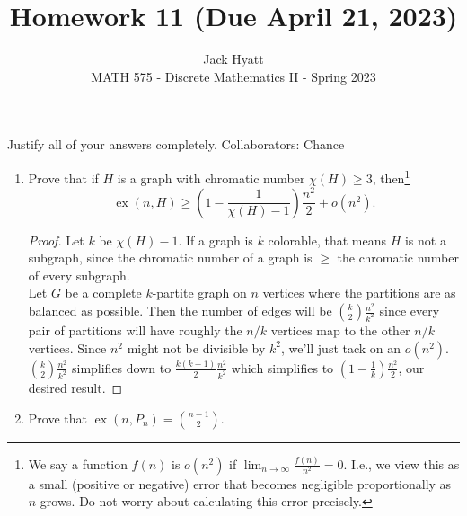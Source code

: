 \documentclass[12pt]{article}
\begin{document}
	
	
	
	\title{Homework 11 (Due April 21, 2023)}
	\author{Jack Hyatt\\ %
		MATH 575 - Discrete Mathematics II - Spring 2023} 
	
	\maketitle
	
	Justify all of your answers completely.\m
	\text{ }\text{ }\text{ }\text{ }\text{ } Collaborators: Chance
	
	
	\medskip 
	
	\begin{enumerate}


\item Prove that if $H$ is a graph with chromatic number $\chi(H) \geq 3$, then\footnote{We say a function $f(n)$ is $o(n^2)$ if $\lim_{n \to \infty} \frac{f(n)}{n^2} =0$. I.e., we view this as a small (positive or negative) error that becomes negligible proportionally as $n$ grows. Do not worry about calculating this error precisely.}
 \[\operatorname{ex}(n, H)\geq \left(1-\frac{1}{\chi(H)-1}\right) \frac{n^2}{2} + o(n^2).\]

\begin{proof}
	Let $k$ be $\chi(H)-1$. If a graph is $k$ colorable, that means $H$ is not a subgraph, since the chromatic number of a graph is $\geq$ the chromatic number of every subgraph.\\
	Let $G$ be a complete $k$-partite graph on $n$ vertices where the partitions are as balanced as possible. Then the number of edges will be ${k\choose 2}\frac{n^2}{k^2}$ since every pair of partitions will have roughly the $n/k$ vertices map to the other $n/k$ vertices. Since $n^2$ might not be divisible by $k^2$, we'll just tack on an $o(n^2)$.\\
	${k\choose 2}\frac{n^2}{k^2}$ simplifies down to $\frac{k(k-1)}{2}\frac{n^2}{k^2}$ which simplifies to $(1-\frac{1}{k})\frac{n^2}{2}$, our desired result.
\end{proof}

\medskip


\item Prove that $\operatorname{ex}(n,P_n) = {n-1 \choose 2}$. 


\end{enumerate}
\end{document}
